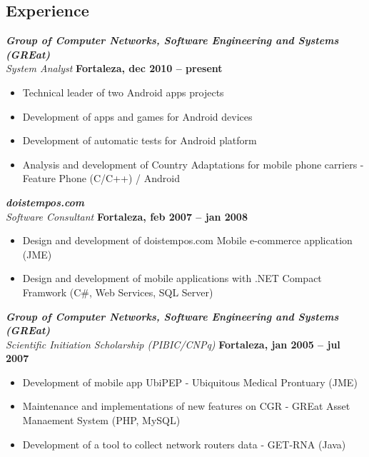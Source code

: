\documentclass[margin, 10pt]{res} %
\begin{document}
\begin{resume}
\section{Experience}
{\sl\bf Group of Computer Networks, Software Engineering and Systems (GREat)}  \\
{\sl System Analyst} \hfill {\bf Fortaleza, dec 2010 -- present}
\begin{itemize} \itemsep -2pt %
\item Technical leader of two Android apps projects
\item Development of apps and games for Android devices
\item Development of automatic tests for Android platform
\item Analysis and development of Country Adaptations for mobile phone carriers - Feature Phone (C/C++) / Android
\end{itemize}
 
{\sl\bf doistempos.com} \\
{\sl Software Consultant} \hfill {\bf Fortaleza, feb 2007 -- jan 2008}
\begin{itemize} \itemsep -2pt 
\item Design and development of doistempos.com Mobile e-commerce application (JME)
\item Design and development of mobile applications with .NET Compact Framwork (C\#, Web Services, SQL Server)
\end{itemize} 


{\sl\bf Group of Computer Networks, Software Engineering and Systems (GREat)}  \\
{\sl Scientific Initiation Scholarship (PIBIC/CNPq)} \hfill {\bf Fortaleza, jan 2005 -- jul 2007}
\begin{itemize} \itemsep -2pt %
\item Development of mobile app UbiPEP - Ubiquitous Medical Prontuary (JME)
\item Maintenance and implementations of new features on CGR - GREat Asset Manaement System (PHP, MySQL)
\item Development of a tool to collect network routers data - GET-RNA (Java)
\end{itemize}



\end{resume}
\end{document}
